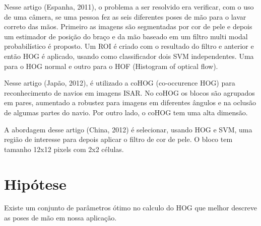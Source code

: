 Nesse artigo \cite{ref16} (Espanha, 2011), o problema a ser resolvido era verificar, com o uso de uma câmera, se uma pessoa  fez as seis diferentes poses de mão para o lavar correto das mãos. Primeiro as imagens são segmentadas por cor de pele e depois um estimador de posição do braço e da mão baseado em um filtro multi modal probabilístico é proposto. Um ROI é criado com o resultado do filtro e anterior e então HOG é aplicado, usando como classificador dois SVM independentes. Uma para o HOG normal e outro para o HOF (Histogram of optical flow).

Nesse artigo \cite{ref8} (Japão, 2012), é utilizado a coHOG (co-occurence HOG) para reconhecimento de navios em imagens ISAR. No coHOG os blocos são agrupados em pares, aumentado a robustez para imagens em diferentes ângulos e na oclusão de algumas partes do navio. Por outro lado, o coHOG tem uma alta dimensão.


A abordagem desse artigo \cite{ref10} (China, 2012) é selecionar, usando HOG e SVM, uma região de interesse para depois aplicar o filtro de cor de pele. O bloco tem tamanho 12x12 pixels com 2x2 células.


\section{Hipótese}

Existe um conjunto de parâmetros ótimo no calculo do HOG que melhor descreve as poses de mão em nossa aplicação.

